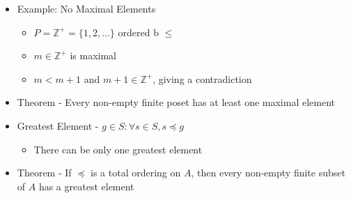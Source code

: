 \documentclass{article}
\begin{document}
\begin{itemize}
    \begin{itemize}
        \item Maximal elements - $\{1,2\},\{3\}$
        \item No element is strictly greater than $\{1,2\}$ or $\{3\}$
    \end{itemize}
    \item Example: No Maximal Elements
    \begin{itemize}
        \item $P=\mathbb{Z}^+ = \{1,2, \dots\}$ ordered b $\le$
        \item $m \in \mathbb{Z}^+$ is maximal
        \item $m < m+1$ and $m+1 \in \mathbb{Z}^+$, giving a contradiction
    \end{itemize}
    \item Theorem - Every non-empty finite poset has at least one maximal element
    \item Greatest Element - $g \in S : \forall s \in S, s \preceq g$
    \begin{itemize}
        \item There can be only one greatest element
    \end{itemize}
    \item Theorem - If $\preceq$ is a total ordering on $A$, then every non-empty finite subset of $A$ has a greatest element

\end{itemize}
\end{document}

